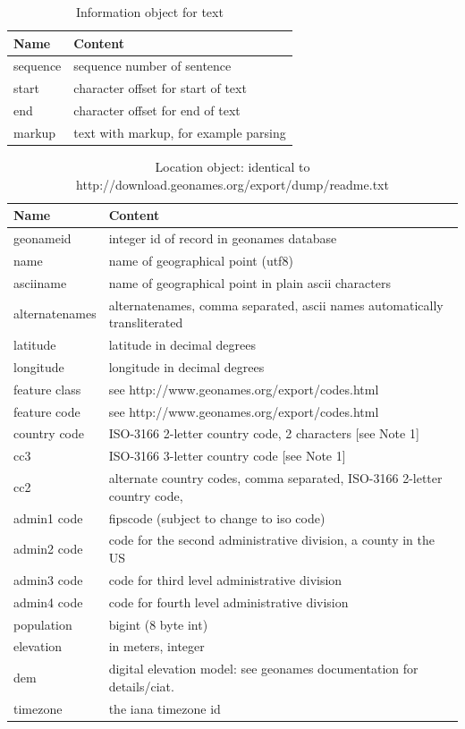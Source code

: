 \documentclass[11pt]{report}
\begin{document}
\begin{table}[htp]
\caption{Information object for text }
\begin{center}
\begin{tabular}{|l|l|}
\hline
Name & Content \\
\hline
sequence & sequence number of sentence \\
start & character offset for start of text  \\
end &  character offset for end of text   \\
markup & text with markup, for example parsing \\
\hline
\end{tabular}
\end{center}
\label{tab:textinfo}
\end{table}%

\begin{table}[htp]
\caption{Location object: identical to http://download.geonames.org/export/dump/readme.txt}
\begin{center}
\begin{tabular}{|l|p{10cm}|}
\hline
Name & Content  \\
\hline
geonameid & integer id of record in geonames database \\
name & name of geographical point (utf8)\\
asciiname & name of geographical point in plain ascii characters \\
alternatenames & alternatenames, comma separated, ascii names automatically transliterated \\
latitude & latitude in decimal degrees\\
longitude & longitude in decimal degrees \\
feature class & see http://www.geonames.org/export/codes.html\\
feature code & see http://www.geonames.org/export/codes.html \\
country code & ISO-3166 2-letter country code, 2 characters [see Note 1] \\
cc3 & ISO-3166 3-letter country code [see Note 1] \\
cc2 & alternate country codes, comma separated, ISO-3166 2-letter country code,  \\
admin1 code & fipscode (subject to change to iso code)\\
admin2 code & code for the second administrative division, a county in the US \\
admin3 code & code for third level administrative division \\
admin4 code & code for fourth level administrative division \\
population & bigint (8 byte int)  \\
elevation & in meters, integer \\
dem & digital elevation model: see geonames documentation for details/ciat. \\
timezone & the iana timezone id  \\
\hline
\end{tabular}
\end{center}
\label{tab:locations}


\end{table}
\end{document}
